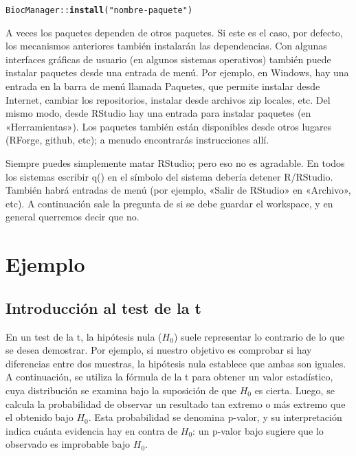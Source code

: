 \documentclass{config/apuntes}\usepackage[]{graphicx}\usepackage[]{xcolor}
\makeatletter
\newcommand{\hlsng}[1]{\textcolor[rgb]{0.192,0.494,0.8}{#1}}%
\newcommand{\hlopt}[1]{\textcolor[rgb]{0,0,0}{#1}}%
\newcommand{\hldef}[1]{\textcolor[rgb]{0.345,0.345,0.345}{#1}}%
\newcommand{\hlkwd}[1]{\textcolor[rgb]{0.737,0.353,0.396}{\textbf{#1}}}%
\newenvironment{kframe}{%
 \def\at@end@of@kframe{}%
 \ifinner\ifhmode%
  \def\at@end@of@kframe{\end{minipage}}%
  \begin{minipage}{\columnwidth}%
 \fi\fi%
 \def\FrameCommand##1{\hskip\@totalleftmargin \hskip-\fboxsep
 \colorbox{shadecolor}{##1}\hskip-\fboxsep
     \hskip-\linewidth \hskip-\@totalleftmargin \hskip\columnwidth}%
 \MakeFramed {\advance\hsize-\width
   \@totalleftmargin\z@ \linewidth\hsize
   \@setminipage}}%
 {\par\unskip\endMakeFramed%
 \at@end@of@kframe}
\newenvironment{knitrout}{}{} %
\makeatother
\begin{document}
\begin{knitrout}
\color{fgcolor}\begin{kframe}
\begin{alltt}
\hldef{BiocManager}\hlopt{::}\hlkwd{install}\hldef{(}\hlsng{"nombre-paquete"}\hldef{)}
\end{alltt}
\end{kframe}
\end{knitrout}

A veces los paquetes dependen de otros paquetes. Si este es el caso, por defecto, los mecanismos anteriores también instalarán las dependencias. Con algunas interfaces gráficas de usuario (en algunos sistemas operativos) también puede instalar paquetes desde una entrada de menú. Por ejemplo, en Windows, hay una entrada en la barra de menú llamada Paquetes, que permite instalar desde Internet, cambiar los repositorios, instalar desde archivos zip locales, etc. Del mismo modo, desde RStudio hay una entrada para instalar paquetes (en «Herramientas»). Los paquetes también están disponibles desde otros lugares (RForge, github, etc); a menudo encontrarás instrucciones allí.

Siempre puedes simplemente matar RStudio; pero eso no es agradable. En todos los sistemas escribir q() en el símbolo del sistema debería detener R/RStudio. También habrá entradas de menú (por ejemplo, «Salir de RStudio» en «Archivo», etc). A continuación sale la pregunta de si se debe guardar el workspace, y en general querremos decir que no.

\chapter{Ejemplo}
\section{Introducción al test de la t}
En un test de la t, la hipótesis nula ($H_0$) suele representar lo contrario de lo que se desea demostrar. Por ejemplo, si nuestro objetivo es comprobar si hay diferencias entre dos muestras, la hipótesis nula establece que ambas son iguales. A continuación, se utiliza la fórmula de la t para obtener un valor estadístico, cuya distribución se examina bajo la suposición de que $H_0$ es cierta. Luego, se calcula la probabilidad de observar un resultado tan extremo o más extremo que el obtenido bajo $H_0$. Esta probabilidad se denomina p-valor, y su interpretación indica cuánta evidencia hay en contra de $H_0$: un p-valor bajo sugiere que lo observado es improbable bajo $H_0$.
\end{document}
